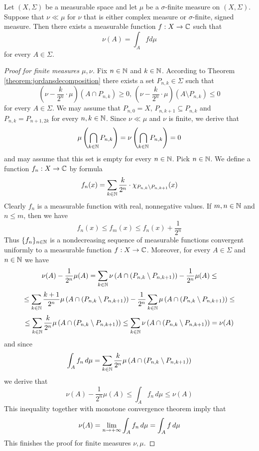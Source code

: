 \begin{theorem}\label{theorem:radonnikodymmain}
Let $(X,\Sigma)$ be a measurable space and let $\mu$ be a $\sigma$-finite measure on $(X,\Sigma)$. Suppose that $\nu \ll \mu$ for $\nu$ that is either complex measure or $\sigma$-finite, signed measure. Then there exists a measurable function $f:X\rightarrow {\mathbb C}$ such that
$$\nu(A) = \int_A f d\mu$$
for every $A\in \Sigma$.
\end{theorem}
\begin{proof}[Proof for finite measures $\mu,\nu$]
Fix $n\in {\mathbb N}$ and $k\in {\mathbb N}$. According to Theorem \ref{theorem:jordansdecomposition} there exists a set $P_{n,k}\in \Sigma$ such that
$$\left(\nu - \frac{k}{2^n}\cdot \mu\right)\left(A\cap P_{n,k}\right)\geq 0,\,\left(\nu - \frac{k}{2^n}\cdot \mu\right)\left(A\setminus P_{n,k}\right)\leq 0$$
for every $A\in \Sigma$. We may assume that $P_{n,0}=X$, $P_{n,k+1}\subseteq P_{n,k}$ and $P_{n,k} =P_{n+1,2k}$ for every $n, k\in {\mathbb N}$. Since $\nu \ll \mu$ and $\nu$ is finite, we derive that
$$\mu\left(\bigcap_{k\in {\mathbb N}}P_{n,k}\right) = \nu\left(\bigcap_{k\in {\mathbb N}}P_{n,k}\right)=0$$
and may assume that this set is empty for every $n\in {\mathbb N}$. Pick $n\in {\mathbb N}$. We define a function $f_n:X\rightarrow {\mathbb C}$ by formula
$$f_n(x) =\sum_{k\in {\mathbb N}} \frac{k}{2^n}\cdot \chi_{P_{n,k}\setminus P_{n,k+1}}(x)$$
Clearly $f_n$ is a measurable function with real, nonnegative values. If $m,n\in {\mathbb N}$ and $n\leq m$, then we have
$$f_n(x)\leq f_m(x)\leq f_n(x)+\frac{1}{2^n}$$
Thus $\{f_n\}_{n\in {\mathbb N}}$ is a nondecreasing sequence of measurable functions convergent uniformly to a measurable function $f:X\rightarrow {\mathbb C}$. Moreover, for every $A\in \Sigma$ and $n\in {\mathbb N}$ we have
$$\nu(A)-\frac{1}{2^n}\mu(A) = \sum_{k\in {\mathbb N}}\nu\left(A\cap \left(P_{n,k}\setminus P_{n,k+1}\right)\right)-\frac{1}{2^n}\mu(A)  \leq$$
$$\leq \sum_{k\in {\mathbb N}}\frac{k+1}{2^n}\mu\left(A\cap \left(P_{n,k}\setminus P_{n,k+1}\right)\right) - \frac{1}{2^n}\sum_{k\in {\mathbb N}}\mu\left(A\cap \left(P_{n,k}\setminus P_{n,k+1}\right)\right) \leq  $$
$$\leq  \sum_{k\in {\mathbb N}}\frac{k}{2^n}\mu\left(A\cap \left(P_{n,k}\setminus P_{n,k+1}\right)\right)\leq \sum_{k\in {\mathbb N}}\nu\left(A\cap \left(P_{n,k}\setminus P_{n,k+1}\right)\right) = \nu(A)$$
and since
$$\int_Af_n\,d\mu =  \sum_{k\in {\mathbb N}}\frac{k}{2^n}\mu\left(A\cap \left(P_{n,k}\setminus P_{n,k+1}\right)\right)$$
we derive that
$$\nu(A)-\frac{1}{2^n}\mu(A) \leq \int_Af_n\,d\mu \leq \nu(A)$$
This inequality together with monotone convergence theorem imply that
$$\nu(A) =  \lim_{n\rightarrow +\infty}\int_Af_n\,d\mu = \int_Af\,d\mu$$
This finishes the proof for finite measures $\nu,\mu$.
\end{proof}

